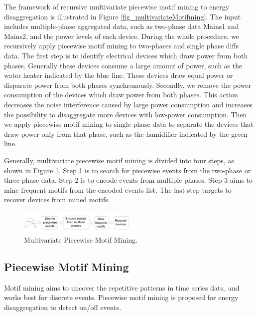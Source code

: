 The framework of recursive multivariate piecewise motif mining to energy disaggregation is illustrated in Figure \ref{fig_multivariateMotifming}. 
The input includes multiple-phase aggregated data, such as two-phase data Mains1 and Mains2, 
and the power levels of each device. 
During the whole procedure, we recursively apply piecewise motif mining to two-phases and single phase diffs data.
The first step is to identify electrical devices which draw power from both phases.
Generally these devices consume a large amount of power, such as the water heater indicated by the blue line.
These devices draw equal power or disparate power from both phases synchronously. 
Secondly, we remove the power consumption of the devices which draw power from both phases.
This action decreases the noise interference caused by large power consumption 
and increases the possibility to disaggregate more devices with low-power consumption. 
Then we apply piecewise motif mining to single-phase data to separate 
the devices that draw power only from that phase, 
such as the humidifier indicated by the green line. 

Generally, multivariate piecewise motif mining is divided into four steps, as shown in Figure \ref{fig_multivariatePiecewiseMotifMining}.
Step 1 is to search for piecewise events from the two-phase or three-phase data.
Step 2 is to encode events from multiple phases. 
Step 3 aims to mine frequent motifs from the encoded events list.
The last step targets to recover devices from mined motifs. 
\begin{figure}[h]
\centering
\includegraphics[width=0.5\textwidth]{multidisaggfig/multivariatePiecewiseMotifMining.pdf}
\caption{Multivariate Piecewise Motif Mining.}
\label{fig_multivariatePiecewiseMotifMining}
\end{figure}

\subsection{Piecewise Motif Mining}
Motif mining aims to uncover the repetitive patterns in time series data, and works best for discrete events. Piecewise motif mining is proposed 
for energy disaggregation to detect on/off events. 


